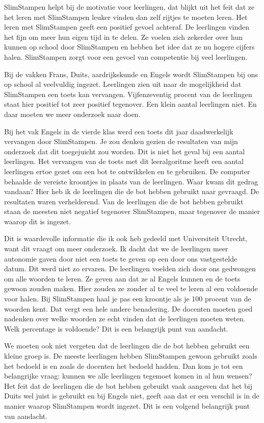 \documentclass[12pt, a4paper]{article}
\begin{document}
SlimStampen helpt bij de motivatie voor leerlingen, dat blijkt uit het feit dat ze het leren met SlimStampen leuker vinden dan zelf rijtjes te moeten leren. Het leren met SlimStampen geeft een positief gevoel achteraf. De leerlingen vinden het fijn om meer hun eigen tijd in te delen. Ze voelen zich zekerder over hun kunnen op school door SlimStampen en hebben het idee dat ze nu hogere cijfers halen. SlimStampen zorgt voor een gevoel van competentie bij veel leerlingen.

Bij de vakken Frans, Duits, aardrijkskunde en Engels wordt SlimStampen bij ons op school al veelvuldig ingezet. Leerlingen zien uit naar de mogelijkheid dat SlimStampen een toets kan vervangen. Vijfenzeventig procent van de leerlingen staat hier positief tot zeer positief tegenover. Een klein aantal leerlingen niet. En daar moeten we meer onderzoek naar doen.

Bij het vak Engels in de vierde klas werd een toets dit jaar daadwerkelijk vervangen door SlimStampen. Je zou denken gezien de resultaten van mijn onderzoek dat dit toegejuicht zou worden. Dit is niet het geval bij een aantal leerlingen. Het vervangen van de toets met dit leeralgoritme heeft een aantal leerlingen ertoe gezet om een bot te ontwikkelen en te gebruiken. De computer behaalde de vereiste kroontjes in plaats van de leerlingen. Waar kwam dit gedrag vandaan? Hier heb ik de leerlingen die de bot hebben gebruikt naar gevraagd. De resultaten waren verhelderend. Van de leerlingen die de bot hebben gebruikt staan de meesten niet negatief tegenover SlimStampen, maar tegenover de manier waarop dit is ingezet. 

Dit is waardevolle informatie die ik ook heb gedeeld met Universiteit Utrecht, want dit vraagt om meer onderzoek. Ik dacht dat we de leerlingen meer autonomie gaven door niet een toets te geven op een door ons vastgestelde datum. Dit werd niet zo ervaren. De leerlingen voelden zich door ons gedwongen om alle woorden te leren. Ze geven aan dat ze al Engels kunnen en de toets gewoon zouden maken. Hier zouden ze zonder al te veel te leren al een voldoende voor halen. Bij SlimStampen haal je pas een kroontje als je 100 procent van de woorden kent. Dat vergt een hele andere benadering. De docenten moeten goed nadenken over welke woorden ze echt vinden dat de leerlingen moeten weten. Welk percentage is voldoende? Dit is een belangrijk punt van aandacht.

We moeten ook niet vergeten dat de leerlingen die de bot hebben gebruikt een kleine groep is. De meeste leerlingen hebben SlimStampen gewoon gebruikt zoals het bedoeld is en zoals de docenten het bedoeld hadden. Dan kom je tot een belangrijke vraag: kunnen we alle leerlingen tegemoet komen in al hun wensen? Het feit dat de leerlingen die de bot hebben gebruikt vaak aangeven dat het bij Duits wel juist is gebruikt en bij Engels niet, geeft aan dat er een verschil is in de manier waarop SlimStampen wordt ingezet. Dit is een volgend belangrijk punt van aandacht.
\end{document}
